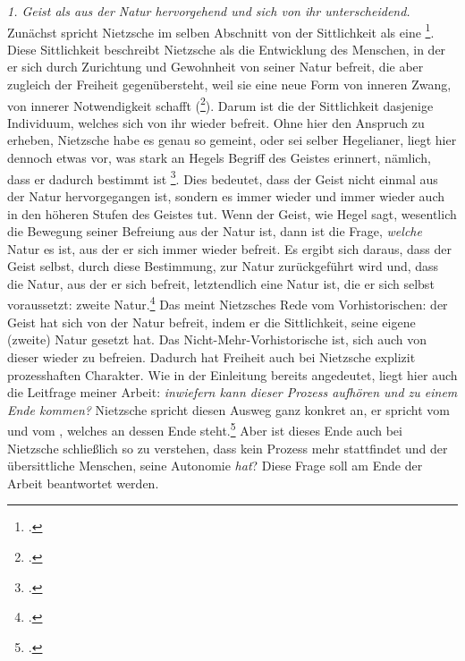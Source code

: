 \documentclass[12pt, a4paper, openany]{report}
\begin{document}
\emph{1. Geist als aus der Natur hervorgehend und sich von ihr unterscheidend.}\\
Zunächst spricht Nietzsche im selben Abschnitt von der Sittlichkeit als eine \footcite[][293]{nietzsche_jenseits_2014}.
Diese Sittlichkeit beschreibt Nietzsche als die Entwicklung des Menschen, in der er sich durch Zurichtung und Gewohnheit von seiner Natur befreit, die aber zugleich der Freiheit gegenübersteht, weil sie eine neue Form von inneren Zwang, von innerer Notwendigkeit schafft (\footcite[][292]{nietzsche_jenseits_2014}).
Darum ist die  der Sittlichkeit dasjenige Individuum, welches sich von ihr wieder befreit.
Ohne hier den Anspruch zu erheben, Nietzsche habe es genau so gemeint, oder sei selber Hegelianer, liegt hier dennoch etwas vor, was stark an Hegels Begriff des Geistes erinnert, nämlich, dass er dadurch bestimmt ist \footcite[][294]{khurana_freiheit_2017}.%
Dies bedeutet, dass der Geist nicht einmal aus der Natur hervorgegangen ist, sondern es immer wieder und immer wieder auch in den höheren Stufen des Geistes tut.
Wenn der Geist, wie Hegel sagt, wesentlich die Bewegung seiner Befreiung aus der Natur ist, dann ist die Frage, \emph{welche} Natur es ist, aus der er sich immer wieder befreit. 
Es ergibt sich daraus, dass der Geist selbst, durch diese Bestimmung, zur Natur zurückgeführt wird und, dass die Natur, aus der er sich befreit, letztendlich eine Natur ist, die er sich selbst voraussetzt: zweite Natur.\footcite[Vgl.][320]{khurana_freiheit_2017}
Das meint Nietzsches Rede vom Vorhistorischen: 
der Geist hat sich von der Natur befreit, indem er die Sittlichkeit, seine eigene (zweite) Natur gesetzt hat. 
Das Nicht-Mehr-Vorhistorische ist, sich auch von dieser wieder zu befreien.
Dadurch hat Freiheit auch bei Nietzsche explizit prozesshaften Charakter. 
Wie in der Einleitung bereits angedeutet, liegt hier auch die Leitfrage meiner Arbeit: \emph{inwiefern kann dieser Prozess aufhören und zu einem Ende kommen?}
Nietzsche spricht diesen Ausweg ganz konkret an, er spricht vom  und vom , welches an dessen Ende steht.\footcite[][293]{nietzsche_jenseits_2014} 
Aber ist dieses Ende auch bei Nietzsche schließlich so zu verstehen, dass kein Prozess mehr stattfindet und der übersittliche Menschen, seine Autonomie \emph{hat}?
Diese Frage soll am Ende der Arbeit beantwortet werden.\\
\end{document}
